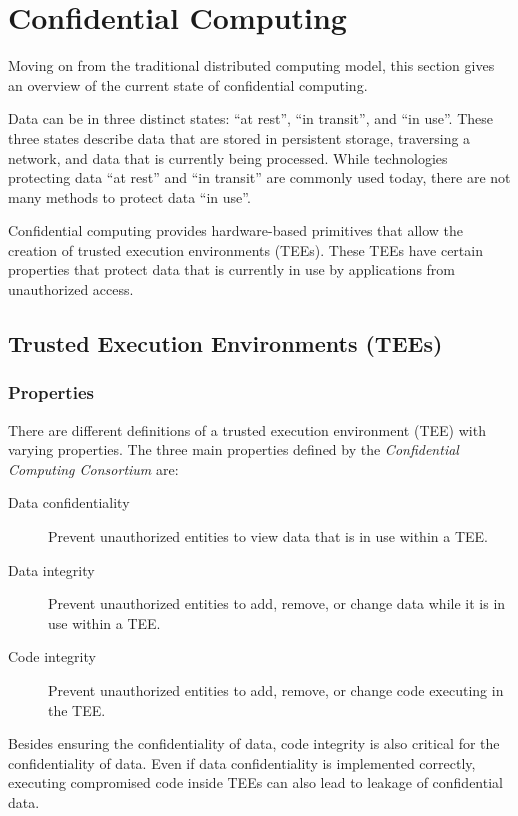 \section{Confidential Computing}
\label{sec:confidential-computing}

Moving on from the traditional distributed computing model, this section gives
an overview of the current state of confidential computing.

Data can be in three distinct states: ``at rest'', ``in transit'', and ``in
use''. These three states describe data that are stored in persistent storage,
traversing a network, and data that is currently being processed. While
technologies protecting data ``at rest'' and ``in transit'' are commonly used
today, there are not many methods to protect data ``in use''.

Confidential computing provides hardware-based primitives that allow the
creation of trusted execution environments (TEEs). These TEEs have certain
properties that protect data that is currently in use by applications from
unauthorized access.

\subsection{Trusted Execution Environments (TEEs)}
\label{sec:tee}

\subsubsection{Properties}

There are different definitions of a trusted execution environment (TEE) with
varying properties. The three main properties defined by the
\textit{Confidential Computing Consortium} \cite{ccc2022technicalanalysis} are:

\begin{description}
  \item[Data confidentiality]
    Prevent unauthorized entities to view data that is in use within a TEE.
  \item[Data integrity]
    Prevent unauthorized entities to add, remove, or change data while it is in
    use within a TEE.
  \item[Code integrity]
    Prevent unauthorized entities to add, remove, or change code executing in
    the TEE.
\end{description}

Besides ensuring the confidentiality of data, code integrity is also critical
for the confidentiality of data. Even if data confidentiality is implemented
correctly, executing compromised code inside TEEs can also lead to leakage of
confidential data.

